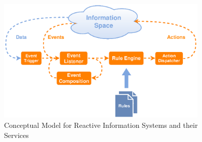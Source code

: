 \begin{figure}[!ht]
  \centering
  \includegraphics[width=0.9\textwidth]{figures/Standard-Model-Template}
  \caption{Conceptual Model for Reactive Information Systems and their Services}
  \label{fig:Standard-Model-Template}
\end{figure}






